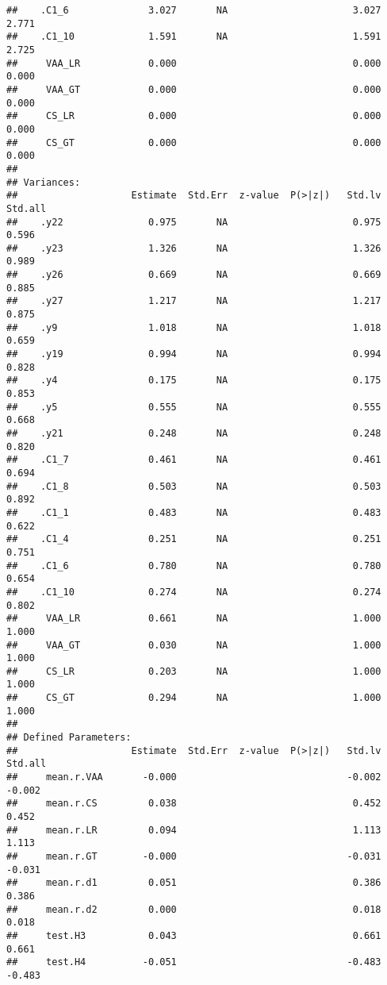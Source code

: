 \documentclass[
]{article}
\begin{document}
\begin{verbatim}
##    .C1_6              3.027       NA                      3.027    2.771
##    .C1_10             1.591       NA                      1.591    2.725
##     VAA_LR            0.000                               0.000    0.000
##     VAA_GT            0.000                               0.000    0.000
##     CS_LR             0.000                               0.000    0.000
##     CS_GT             0.000                               0.000    0.000
## 
## Variances:
##                    Estimate  Std.Err  z-value  P(>|z|)   Std.lv  Std.all
##    .y22               0.975       NA                      0.975    0.596
##    .y23               1.326       NA                      1.326    0.989
##    .y26               0.669       NA                      0.669    0.885
##    .y27               1.217       NA                      1.217    0.875
##    .y9                1.018       NA                      1.018    0.659
##    .y19               0.994       NA                      0.994    0.828
##    .y4                0.175       NA                      0.175    0.853
##    .y5                0.555       NA                      0.555    0.668
##    .y21               0.248       NA                      0.248    0.820
##    .C1_7              0.461       NA                      0.461    0.694
##    .C1_8              0.503       NA                      0.503    0.892
##    .C1_1              0.483       NA                      0.483    0.622
##    .C1_4              0.251       NA                      0.251    0.751
##    .C1_6              0.780       NA                      0.780    0.654
##    .C1_10             0.274       NA                      0.274    0.802
##     VAA_LR            0.661       NA                      1.000    1.000
##     VAA_GT            0.030       NA                      1.000    1.000
##     CS_LR             0.203       NA                      1.000    1.000
##     CS_GT             0.294       NA                      1.000    1.000
## 
## Defined Parameters:
##                    Estimate  Std.Err  z-value  P(>|z|)   Std.lv  Std.all
##     mean.r.VAA       -0.000                              -0.002   -0.002
##     mean.r.CS         0.038                               0.452    0.452
##     mean.r.LR         0.094                               1.113    1.113
##     mean.r.GT        -0.000                              -0.031   -0.031
##     mean.r.d1         0.051                               0.386    0.386
##     mean.r.d2         0.000                               0.018    0.018
##     test.H3           0.043                               0.661    0.661
##     test.H4          -0.051                              -0.483   -0.483
\end{verbatim}
\end{document}
